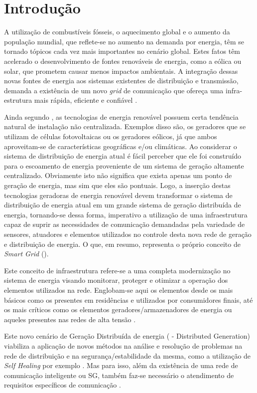 \chapter{Introdução}
\label{cap_introducao}
A utilização de combustíveis fósseis, o aquecimento global e o aumento da população mundial, que reflete-se no aumento na demanda por energia, têm se tornado tópicos cada vez mais importantes no cenário global. Estes fatos têm acelerado o desenvolvimento de fontes renováveis de energia, como a eólica ou solar, que prometem causar menos impactos ambientais. A integração dessas novas fontes de energia aos sistemas existentes de distribuição e transmissão, demanda a existência de um novo \emph{grid} de comunicação que ofereça uma infra-estrutura mais rápida, eficiente e confiável \cite{Art-Gungor2013}.

Ainda segundo \cite{Art-Gungor2013}, as tecnologias de energia renovável possuem certa tendência natural de instalação não centralizada. Exemplos disso são, os geradores que se utilizam de células fotovoltaicas ou os geradores eólicos, já que ambos aproveitam-se de características geográficas e/ou climáticas. Ao considerar o sistema de distribuição de energia atual é fácil perceber que ele foi construído para o escoamento de energia proveniente de um sistema de geração altamente centralizado. Obviamente isto não significa que exista apenas um ponto de geração de energia, mas sim que eles são pontuais. Logo, a inserção destas tecnologias geradoras de energia renovável devem transformar o sistema de distribuição de energia atual em um grande sistema de geração distribuída de energia, tornando-se dessa forma, imperativo a utilização de uma infraestrutura capaz de suprir as necessidades de comunicação demandadas pela variedade de sensores, atuadores e elementos utilizados no controle desta nova rede de geração e distribuição de energia. O que, em resumo, representa o próprio conceito de \emph{Smart Grid} ().

Este conceito de infraestrutura refere-se a uma completa modernização no sistema de energia visando monitorar, proteger e otimizar a operação dos elementos utilizados na rede. Englobam-se aqui os elementos desde os mais básicos como os presentes em residências e utilizados por consumidores finais, até os mais críticos como os elementos geradores/armazenadores de energia ou aqueles presentes nas redes de alta tensão \cite{Conf-Sood2009}.

Este novo cenário de Geração Distribuída de energia ( - Distributed Generation) viabiliza a aplicação de novos métodos na análise e resolução de problemas na rede de distribuição e na segurança/estabilidade da mesma, como a utilização de \emph{Self Healing} por exemplo \cite{Art-Amin2006}. Mas para isso, além da existência de uma rede de comunicação inteligente ou SG, também faz-se necessário o atendimento de requisitos específicos de comunicação \cite{Conf-Sood2009}.

